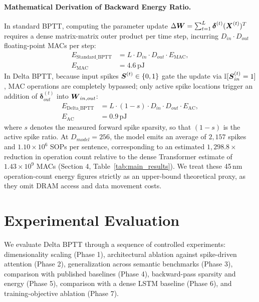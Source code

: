 \documentclass[runningheads]{llncs}
\begin{document}
\paragraph{Mathematical Derivation of Backward Energy Ratio.} In standard BPTT, computing the parameter update $\Delta \boldsymbol{W} = \sum_{t=1}^L \boldsymbol{\delta}^{(t)} (\boldsymbol{X}^{(t)})^T$ requires a dense matrix-matrix outer product per time step, incurring $D_{in} \cdot D_{out}$ floating-point MACs per step:
\begin{equation}
\begin{aligned}
E_{\text{Standard\_BPTT}} &= L \cdot D_{in} \cdot D_{out} \cdot E_{\text{MAC}}, \\
E_{\text{MAC}} &= 4.6\,\text{pJ}
\end{aligned}
\end{equation}
In Delta BPTT, because input spikes $\boldsymbol{S}^{(t)} \in \{0, 1\}$ gate the update via $\mathbb{I}[\boldsymbol{S}_{in}^{(t)}=1]$, MAC operations are completely bypassed; only active spike locations trigger an addition of $\bm{\delta}_{out}^{(t)}$ into $\boldsymbol{W}_{in, out}$:
\begin{equation}
\begin{aligned}
E_{\text{Delta\_BPTT}} &= L \cdot (1-s) \cdot D_{in} \cdot D_{out} \cdot E_{\text{AC}}, \\
E_{\text{AC}} &= 0.9\,\text{pJ}
\end{aligned}
\end{equation}
where $s$ denotes the measured forward spike sparsity, so that $(1-s)$ is the active spike ratio. At $D_{model}=256$, the model emits an average of $2{,}157$ spikes and $1.10 \times 10^6$ SOPs per sentence, corresponding to an estimated $1{,}298.8\times$ reduction in operation count relative to the dense Transformer estimate of $1.43 \times 10^9$ MACs (Section 4, Table~\ref{tab:main_results}). We treat these 45\,nm operation-count energy figures strictly as an upper-bound theoretical proxy, as they omit DRAM access and data movement costs.

\section{Experimental Evaluation}

We evaluate Delta BPTT through a sequence of controlled experiments: dimensionality scaling (Phase 1), architectural ablation against spike-driven attention (Phase 2), generalization across semantic benchmarks (Phase 3), comparison with published baselines (Phase 4), backward-pass sparsity and energy (Phase 5), comparison with a dense LSTM baseline (Phase 6), and training-objective ablation (Phase 7).
\end{document}
